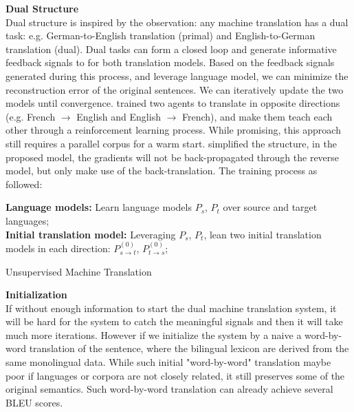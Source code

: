 \textbf{Dual Structure}\\
Dual structure is inspired by the observation: any machine translation has a dual task: e.g. German-to-English translation (primal) and English-to-German translation (dual). Dual tasks can form a closed loop and generate informative  feedback signals to for both translation models. Based on the feedback signals generated during this process, and leverage language model, we can minimize the reconstruction error of the original sentences. We can iteratively update the two models until convergence.   \cite{he2016dual} trained two agents to translate in opposite directions (e.g. French $\rightarrow$ English and English $\rightarrow$ French), and make them teach each other through a reinforcement learning process. While promising, this approach still requires a parallel corpus for a warm start. \cite{lample2018phrase} simplified the structure, in the proposed model, the gradients will not be back-propagated through the reverse model, but only make use of the back-translation. The training process as followed:

\begin{algorithm}[H]
	\SetAlgoLined
	\textbf{Language models:} Learn language models $P_s$, $P_t$ over source and target languages;\\
	\textbf{Initial translation model:}  Leveraging $P_s$, $P_t$, lean two initial translation models in each direction: $P_{s\rightarrow t}^{(0)}$, ${P_{t \rightarrow s}^{(0)}}$;\\
	\caption{Unsupervised Machine Translation}
\end{algorithm}



\textbf{Initialization}\\
If without enough information to start the dual machine translation system, it will be hard for the system to catch the meaningful signals and then it will take much more iterations. However if we initialize the system by a naive a word-by-word translation of the sentence, where the bilingual lexicon are derived from the same monolingual data. While such initial "word-by-word" translation maybe poor if languages or corpora are not closely related, it still preserves some of the original semantics. Such word-by-word translation can already achieve several BLEU scores.\\

